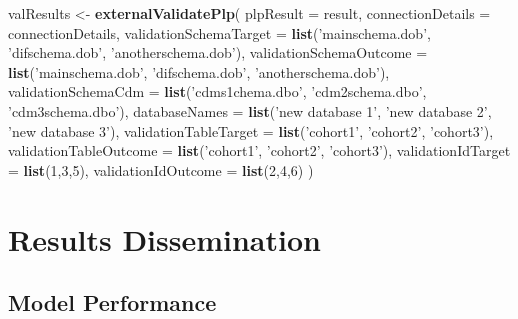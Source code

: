 \documentclass[11pt]{book}
\newenvironment{Shaded}{\begin{snugshade}}{\end{snugshade}}
\newcommand{\KeywordTok}[1]{\textcolor[rgb]{0.13,0.29,0.53}{\textbf{#1}}}
\newcommand{\DataTypeTok}[1]{\textcolor[rgb]{0.13,0.29,0.53}{#1}}
\newcommand{\DecValTok}[1]{\textcolor[rgb]{0.00,0.00,0.81}{#1}}
\newcommand{\StringTok}[1]{\textcolor[rgb]{0.31,0.60,0.02}{#1}}
\newcommand{\NormalTok}[1]{#1}
\theoremstyle{definition}
\theoremstyle{definition}
\theoremstyle{definition}
\theoremstyle{remark}
\begin{document}
\begin{Shaded}
\begin{Highlighting}[]
\NormalTok{valResults <-}\StringTok{ }\KeywordTok{externalValidatePlp}\NormalTok{(}
    \DataTypeTok{plpResult =}\NormalTok{ result, }
    \DataTypeTok{connectionDetails =}\NormalTok{ connectionDetails,}
    \DataTypeTok{validationSchemaTarget =} \KeywordTok{list}\NormalTok{(}\StringTok{'mainschema.dob'}\NormalTok{,}
                                \StringTok{'difschema.dob'}\NormalTok{, }
                                \StringTok{'anotherschema.dob'}\NormalTok{),}
    \DataTypeTok{validationSchemaOutcome =} \KeywordTok{list}\NormalTok{(}\StringTok{'mainschema.dob'}\NormalTok{,}
                                 \StringTok{'difschema.dob'}\NormalTok{, }
                                 \StringTok{'anotherschema.dob'}\NormalTok{),}
    \DataTypeTok{validationSchemaCdm =} \KeywordTok{list}\NormalTok{(}\StringTok{'cdms1chema.dbo'}\NormalTok{,}
                             \StringTok{'cdm2schema.dbo'}\NormalTok{,}
                             \StringTok{'cdm3schema.dbo'}\NormalTok{),}
    \DataTypeTok{databaseNames =} \KeywordTok{list}\NormalTok{(}\StringTok{'new database 1'}\NormalTok{,}
                       \StringTok{'new database 2'}\NormalTok{,}
                       \StringTok{'new database 3'}\NormalTok{),}
    \DataTypeTok{validationTableTarget =} \KeywordTok{list}\NormalTok{(}\StringTok{'cohort1'}\NormalTok{,}
                               \StringTok{'cohort2'}\NormalTok{,}
                               \StringTok{'cohort3'}\NormalTok{),}
    \DataTypeTok{validationTableOutcome =} \KeywordTok{list}\NormalTok{(}\StringTok{'cohort1'}\NormalTok{,}
                                \StringTok{'cohort2'}\NormalTok{,}
                                \StringTok{'cohort3'}\NormalTok{),}
    \DataTypeTok{validationIdTarget =} \KeywordTok{list}\NormalTok{(}\DecValTok{1}\NormalTok{,}\DecValTok{3}\NormalTok{,}\DecValTok{5}\NormalTok{),}
    \DataTypeTok{validationIdOutcome =} \KeywordTok{list}\NormalTok{(}\DecValTok{2}\NormalTok{,}\DecValTok{4}\NormalTok{,}\DecValTok{6}\NormalTok{)}
\NormalTok{)}
\end{Highlighting}
\end{Shaded}

\section{Results Dissemination}\label{results-dissemination}

\subsection{Model Performance}\label{model-performance}
\end{document}
